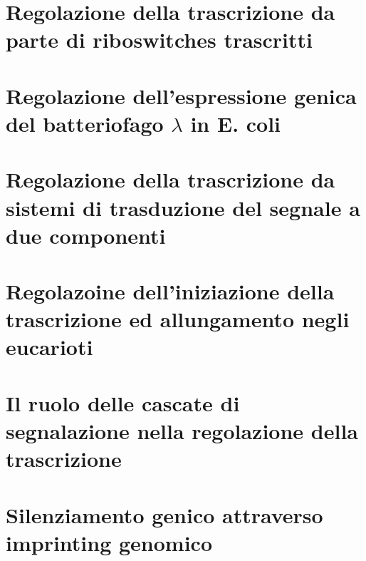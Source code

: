 \section{Regolazione della trascrizione da parte di riboswitches trascritti}

\section{Regolazione dell'espressione genica del batteriofago $\lambda$ in E. coli}

\section{Regolazione della trascrizione da sistemi di trasduzione del segnale a due componenti}

\section{Regolazoine dell'iniziazione della trascrizione ed allungamento negli eucarioti}

\section{Il ruolo delle cascate di segnalazione nella regolazione della trascrizione}

\section{Silenziamento genico attraverso imprinting genomico}
